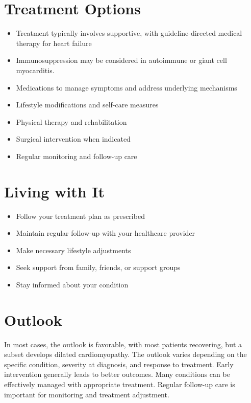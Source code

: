 \section{Treatment Options}
\begin{itemize}[noitemsep]
  \item Treatment typically involves supportive, with guideline-directed medical therapy for heart failure
  \item Immunosuppression may be considered in autoimmune or giant cell myocarditis.
  \item Medications to manage symptoms and address underlying mechanisms
  \item Lifestyle modifications and self-care measures
  \item Physical therapy and rehabilitation
  \item Surgical intervention when indicated
  \item Regular monitoring and follow-up care
\end{itemize}
\section{Living with It}
\begin{itemize}[noitemsep]
  \item Follow your treatment plan as prescribed
  \item Maintain regular follow-up with your healthcare provider
  \item Make necessary lifestyle adjustments
  \item Seek support from family, friends, or support groups
  \item Stay informed about your condition
\end{itemize}
\section{Outlook}
In most cases, the outlook is favorable, with most patients recovering, but a subset develops dilated cardiomyopathy. The outlook varies depending on the specific condition, severity at diagnosis, and response to treatment. Early intervention generally leads to better outcomes. Many conditions can be effectively managed with appropriate treatment. Regular follow-up care is important for monitoring and treatment adjustment.
